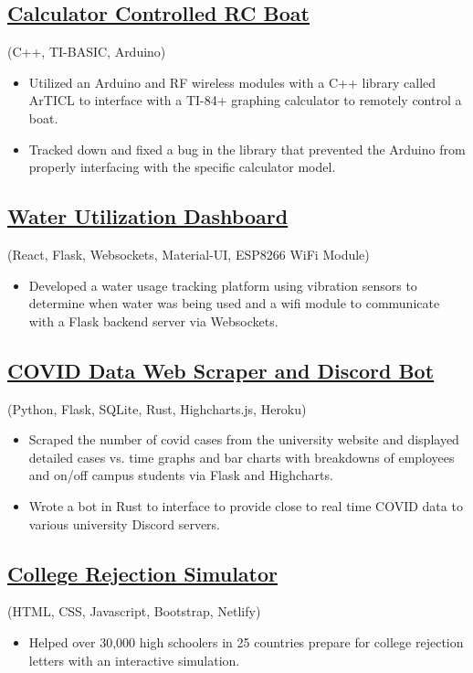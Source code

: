 \documentclass{article}
\begin{document}
\subsection{\href{https://youtu.be/DLzxrzFCyOs}{\underline{Calculator Controlled RC Boat}}} \hfill (C++, TI-BASIC, Arduino)
\begin{itemize}
    \item Utilized an Arduino and RF wireless modules with a C++ library called ArTICL to interface with a TI-84+ graphing calculator to remotely control a boat.
    \item Tracked down and fixed a bug in the library that prevented the Arduino from properly interfacing with the specific calculator model.
\end{itemize}

\subsection{\href{https://youtu.be/DLzxrzFCyOs}{\underline{Water Utilization Dashboard}}} \hfill (React, Flask, Websockets, Material-UI, ESP8266 WiFi Module)
\begin{itemize}
    \item Developed a water usage tracking platform using vibration sensors to determine when water was being used and a wifi module to communicate with a Flask backend server via Websockets. 
\end{itemize}

\subsection{\href{https://youtu.be/DLzxrzFCyOs}{\underline{COVID Data Web Scraper and Discord Bot}}} \hfill (Python, Flask, SQLite, Rust, Highcharts.js, Heroku)
\begin{itemize}
    \item Scraped the number of covid cases from the university website and displayed detailed cases vs. time graphs and bar charts with breakdowns of employees and on/off campus students via Flask and Highcharts.
    \item Wrote a bot in Rust to interface to provide close to real time COVID data to various university Discord servers.
\end{itemize}

\subsection{\href{https://youtu.be/DLzxrzFCyOs}{\underline{College Rejection Simulator}}} \hfill (HTML, CSS, Javascript, Bootstrap, Netlify)
\begin{itemize}
    \item Helped over 30,000 high schoolers in 25 countries prepare for college rejection letters with an interactive simulation.
\end{itemize}
\end{document}
